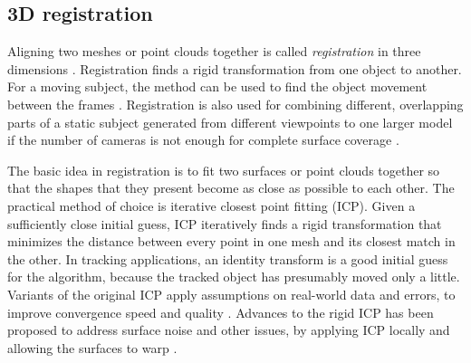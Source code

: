 
\subsection{3D registration} %

Aligning two meshes or point clouds together is called \emph{registration} in three dimensions \cite{zhang1994iterative,rusinkiewicz2001efficient}.
Registration finds a rigid transformation from one object to another.
For a moving subject, the method can be used to find the object movement between the frames \cite{pons2005modelling,zhao2005alignment}.
Registration is also used for combining different, overlapping parts of a static subject generated from different viewpoints to one larger model if the number of cameras is not enough for complete surface coverage \cite{eggert1998simultaneous,huber2003fully}.

The basic idea in registration is to fit two surfaces or point clouds together so that the shapes that they present become as close as possible to each other.
The practical method of choice is iterative closest point fitting (ICP).
Given a sufficiently close initial guess, ICP iteratively finds a rigid transformation that minimizes the distance between every point in one mesh and its closest match in the other.
In tracking applications, an identity transform is a good initial guess for the algorithm, because the tracked object has presumably moved only a little.
Variants of the original ICP apply assumptions on real-world data and errors, to improve convergence speed and quality \cite{zhang1994iterative,rusinkiewicz2001efficient}.
Advances to the rigid ICP has been proposed to address surface noise and other issues, by applying ICP locally and allowing the surfaces to warp \cite{brown2007global}.


